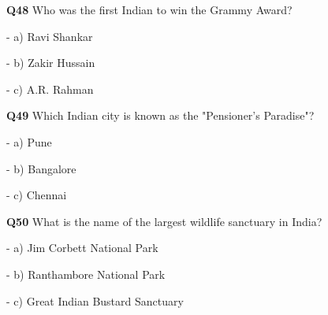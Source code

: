 \textbf{Q48} Who was the first Indian to win the Grammy Award?\par
\quad - a) Ravi Shankar\par
\quad - b) Zakir Hussain\par
\quad - c) A.R. Rahman\par

\textbf{Q49} Which Indian city is known as the "Pensioner's Paradise"?\par
\quad - a) Pune\par
\quad - b) Bangalore\par
\quad - c) Chennai\par

\textbf{Q50} What is the name of the largest wildlife sanctuary in India?\par
\quad - a) Jim Corbett National Park\par
\quad - b) Ranthambore National Park\par
\quad - c) Great Indian Bustard Sanctuary\par